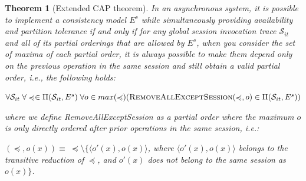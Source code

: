 \documentclass[journal,compsoc]{IEEEtran}
\newtheorem{theorem}{Theorem}[section]
\begin{document}
\begin{theorem}[Extended CAP theorem] 
In an asynchronous system, it is possible to implement a consistency model $E^s$ while simultaneously providing availability and partition tolerance if and only if for any global session invocation trace $\mathcal{S}_{it}$ and all of its partial orderings that are allowed by $E^s$, when you consider the set of maxima of each partial order, it is always possible to make them depend only on the previous operation in the same session and still obtain a valid partial order, i.e., the following holds:


 $\forall \mathcal{S}_{it} \; \forall \preccurlyeq \in \Pi(\mathcal{S}_{it},E^s) \; \forall o \in max(\preccurlyeq) \\ (\textsc{RemoveAllExceptSession}(\preccurlyeq,o) \in \Pi(\mathcal{S}_{it},E^s) ) $

where we define {\sc RemoveAllExceptSession} as a partial order where the maximum $o$ is only directly ordered after prior operations in the same session, i.e.:

$(\preccurlyeq,o(x)) \equiv \; \preccurlyeq \setminus \{ \langle o'(x),o(x) \rangle$, where $\langle o'(x),o(x) \rangle$ belongs to the transitive reduction of $\preccurlyeq$, and $o'(x)$ does not belong to the same session as $o(x)\}$.



 \end{theorem} \label{thrm:cap}
\end{document}
